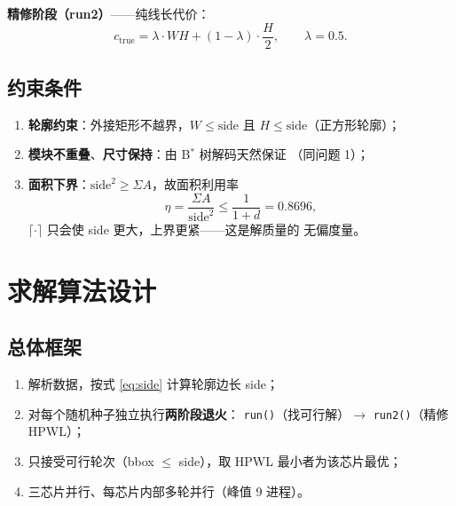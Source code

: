 \documentclass[12pt,a4paper]{article}
\begin{document}
\textbf{精修阶段（run2）}——纯线长代价：
\begin{equation}
c_{\text{true}} = \lambda \cdot WH + (1 - \lambda) \cdot \frac{H}{2},
\qquad \lambda = 0.5.
\end{equation}

\subsection{约束条件}

\begin{enumerate}
    \item \textbf{轮廓约束}：外接矩形不越界，$W \le \text{side}$ 且
    $H \le \text{side}$（正方形轮廓）；
    \item \textbf{模块不重叠}、\textbf{尺寸保持}：由 B$^*$ 树解码天然保证
    （同问题 1）；
    \item \textbf{面积下界}：$\text{side}^2 \ge \Sigma A$，故面积利用率
    \begin{equation}
    \eta = \frac{\Sigma A}{\text{side}^2} \le \frac{1}{1+d} = 0.8696,
    \end{equation}
    $\lceil \cdot \rceil$ 只会使 side 更大，上界更紧——这是解质量的
    无偏度量。
\end{enumerate}

\section{求解算法设计}

\subsection{总体框架}

\begin{tcolorbox}[colback=blue!5, colframe=blue!60, title=算法流程]
\begin{enumerate}
    \item 解析数据，按式 \eqref{eq:side} 计算轮廓边长 side；
    \item 对每个随机种子独立执行\textbf{两阶段退火}：
    \texttt{run()}（找可行解）$\rightarrow$ \texttt{run2()}（精修 HPWL）；
    \item 只接受可行轮次（bbox $\le$ side），取 HPWL 最小者为该芯片最优；
    \item 三芯片并行、每芯片内部多轮并行（峰值 9 进程）。
\end{enumerate}
\end{tcolorbox}
\end{document}
